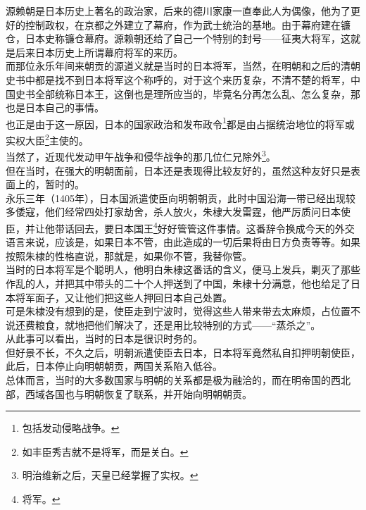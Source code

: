 \begin{multicols}{\theparacolNo}
源赖朝是日本历史上著名的政治家，后来的德川家康一直奉此人为偶像，他为了更好的控制政权，在京都之外建立了幕府，作为武士统治的基地。由于幕府建在镰仓，日本史称镰仓幕府。源赖朝还给了自己一个特别的封号——征夷大将军，这就是后来日本历史上所谓幕府将军的来历。\\

而那位永乐年间来朝贡的源道义就是当时的日本将军，当然，在明朝和之后的清朝史书中都是找不到日本将军这个称呼的，对于这个来历复杂，不清不楚的将军，中国史书全部统称日本王，这倒也是理所应当的，毕竟名分再怎么乱、怎么复杂，那也是日本自己的事情。\\

也正是由于这一原因，日本的国家政治和发布政令\footnote{包括发动侵略战争。}都是由占据统治地位的将军或实权大臣\footnote{如丰臣秀吉就不是将军，而是关白。}主使的。\\

当然了，近现代发动甲午战争和侵华战争的那几位仁兄除外\footnote{明治维新之后，天皇已经掌握了实权。}。\\

但在当时，在强大的明朝面前，日本还是表现得比较友好的，虽然这种友好只是表面上的，暂时的。\\

永乐三年（1405年），日本国派遣使臣向明朝朝贡，此时中国沿海一带已经出现较多倭寇，他们经常四处打家劫舍，杀人放火，朱棣大发雷霆，他严厉质问日本使臣，并让他带话回去，要日本国王\footnote{将军。}好好管管这件事情。这番辞令换成今天的外交语言来说，应该是，如果日本不管，由此造成的一切后果将由日方负责等等。如果按照朱棣的性格直说，那就是，如果你不管，我替你管。\\

当时的日本将军是个聪明人，他明白朱棣这番话的含义，便马上发兵，剿灭了那些作乱的人，并把其中带头的二十个人押送到了中国，朱棣十分满意，他也给足了日本将军面子，又让他们把这些人押回日本自己处置。\\

可是朱棣没有想到的是，使臣走到宁波时，觉得这些人带来带去太麻烦，占位置不说还费粮食，就地把他们解决了，还是用比较特别的方式——“蒸杀之”。\\

从此事可以看出，当时的日本是很识时务的。\\

但好景不长，不久之后，明朝派遣使臣去日本，日本将军竟然私自扣押明朝使臣，此后，日本停止向明朝朝贡，两国关系陷入低谷。\\

总体而言，当时的大多数国家与明朝的关系都是极为融洽的，而在明帝国的西北部，西域各国也与明朝恢复了联系，并开始向明朝朝贡。\\


\end{multicols}
